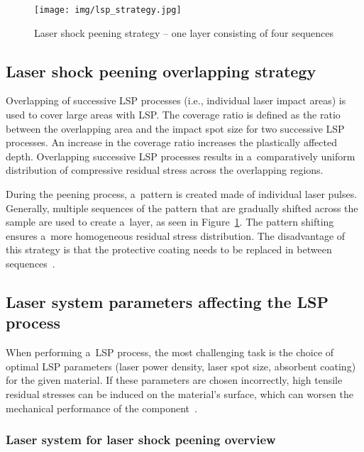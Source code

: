 \begin{figure}[H]
    \centering
    \texttt{[image: img/lsp\_strategy.jpg]}
    \caption[Laser shock peening strategy -- one layer consisting of four sequences]{Laser shock peening strategy -- one layer consisting of four sequences \protect\cite{bohm_kaufman_brajer_rostohar_2019}}
    \label{fig:lspstrategy}
\end{figure}

\subsection{Laser shock peening overlapping strategy}

Overlapping of successive LSP processes (i.e., individual laser impact areas) is used to cover large areas with LSP. The coverage ratio is defined as the ratio between the overlapping area and the impact spot size for two successive LSP processes. An increase in the coverage ratio increases the plastically affected depth. Overlapping successive LSP processes results in a~comparatively uniform distribution of compressive residual stress across the overlapping regions.

During the peening process, a~pattern is created made of individual laser pulses. Generally, multiple sequences of the pattern that are gradually shifted across the sample are used to create a~layer, as seen in Figure~\ref{fig:lspstrategy}. The pattern shifting ensures a~more homogeneous residual stress distribution. The disadvantage of this strategy is that the protective coating needs to be replaced in between sequences~\cite{kaufman}.





\subsection{Laser system parameters affecting the LSP process}

When performing a~LSP process, the most challenging task is the choice of optimal LSP parameters (laser power density, laser spot size, absorbent coating) for the given material. If these parameters are chosen incorrectly, high tensile residual stresses can be induced on the material's surface, which can worsen the mechanical performance of the component~\cite{clauer_holbrook_fairand_1981}.  



\subsubsection*{Laser system for laser shock peening overview}

